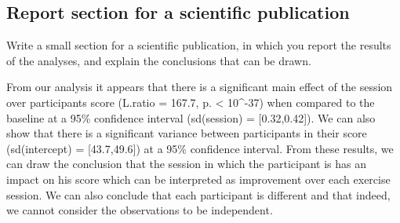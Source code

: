 \documentclass[]{article}
\begin{document}
\subsection{Report section for a scientific
publication}\label{report-section-for-a-scientific-publication-4}

Write a small section for a scientific publication, in which you report
the results of the analyses, and explain the conclusions that can be
drawn.

From our analysis it appears that there is a significant main effect of
the session over participants score (L.ratio = 167.7, p. \textless{}
10\^{}-37) when compared to the baseline at a 95\% confidence interval
(sd(session) = {[}0.32,0.42{]}). We can also show that there is a
significant variance between participants in their score (sd(intercept)
= {[}43.7,49.6{]}) at a 95\% confidence interval. From these results, we
can draw the conclusion that the session in which the participant is has
an impact on his score which can be interpreted as improvement over each
exercise session. We can also conclude that each participant is
different and that indeed, we cannot consider the observations to be
independent.
\end{document}
